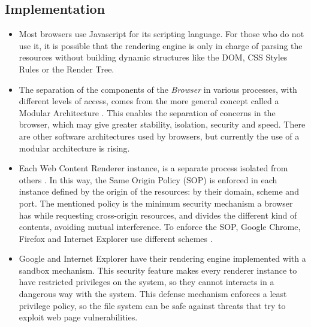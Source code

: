 \documentclass[prodmode,acmtecs]{acmsmall}
\begin{document}
    

  \subsection*{Implementation}
    \begin{itemize}\leftskip0.2em
      \item Most browsers use Javascript for its scripting language. For those who do not use it, it is possible that the rendering engine is only in charge of parsing the resources without building dynamic structures like the DOM, CSS Styles Rules or the Render Tree.
      \item The separation of the components of the \textit{Browser} in various processes, with different levels of access, comes from the more general concept called a Modular Architecture \cite{Vrbanec2013}. This enables the separation of concerns in the browser, which may give greater stability, isolation, security and speed. There are other software architectures used by browsers, but currently the use of a modular architecture is rising.
      \item Each Web Content Renderer instance, is a separate process isolated from others \cite{GoogleChromeIsolation,FirefoxThreatModel}. In this way, the Same Origin Policy (SOP) \cite{W3C-SOP} is enforced in each instance defined by the origin of the resources: by their domain, scheme and port. The mentioned policy  is the minimum security mechanism a browser has while requesting cross-origin resources, and divides the different kind of contents, avoiding mutual interference. To enforce the SOP, Google Chrome, Firefox and Internet Explorer use different schemes \cite{Crowley2010,Reis2009,Jackson2008}.
      \item Google and Internet Explorer have their rendering engine implemented with a sandbox mechanism. This security feature makes every renderer instance to have restricted privileges on the system, so they cannot interacts in a dangerous way with the system. This defense mechanism enforces a least privilege policy, so the file system can be safe against threats that try to exploit web page vulnerabilities.
    \end{itemize}
\end{document}
